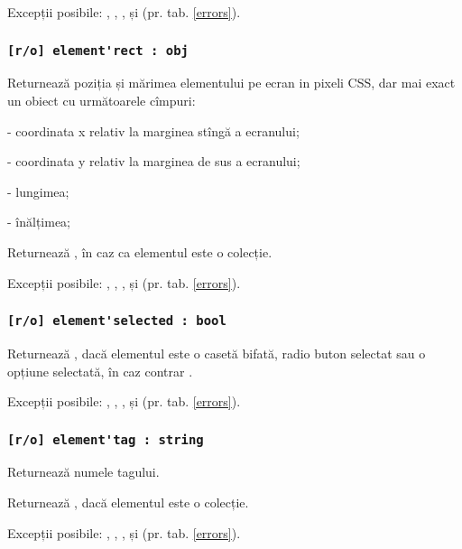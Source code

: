 Excepții posibile: , , ,  și  (pr. tab. \ref{errors}).

\subsubsection{\lstinline|[r/o] element'rect : obj|}

Returnează poziția și mărimea elementului pe ecran in pixeli CSS, dar mai exact un obiect cu următoarele cîmpuri:
\begin{icItems}
	\item {} - coordinata x relativ la marginea stîngă a ecranului;
	\item {} - coordinata y relativ la marginea de sus a ecranului;
	\item {} - lungimea;
	\item {} - înălțimea;
\end{icItems}

\code{[icL]} Returnează \set, în caz ca elementul este o colecție.

Excepții posibile: , , ,  și  (pr. tab. \ref{errors}).

\subsubsection{\lstinline|[r/o] element'selected : bool|}

Returnează \true, dacă elementul este o casetă bifată, radio buton selectat sau o opțiune selectată, în caz contrar \false.

Excepții posibile: , , ,  și  (pr. tab. \ref{errors}).

\subsubsection{\lstinline|[r/o] element'tag : string|}

Returnează numele tagului.

\code{[icL]} Returnează \listtype, dacă elementul este o colecție.

Excepții posibile: , , ,  și  (pr. tab. \ref{errors}).

